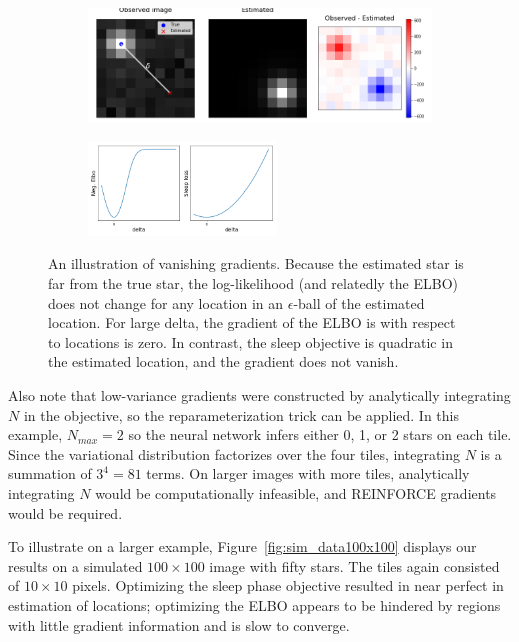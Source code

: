 \begin{figure}[!htb]
    \centering
    \begin{subfigure}[t]{0.8\textwidth}
    \centering
    \includegraphics[width=\textwidth]{figures/gradzero_cartoon.png}
    \end{subfigure}
    \begin{subfigure}[t]{\textwidth}
    \centering
    \includegraphics[width=0.55\textwidth]{figures/gradzero_cartoon2.png}
    \end{subfigure}
    \vspace{-3em}
    \caption{An illustration of vanishing gradients. Because the estimated star is far from the true star, the log-likelihood (and relatedly the ELBO) does not change for any location in an $\epsilon$-ball of the estimated location. 
    For large delta, the gradient of the ELBO is with respect to locations is zero. In contrast, the sleep objective is quadratic in the estimated location, and the gradient does not vanish. }
    \label{fig:gradzero_cartoon}
\end{figure}

Also note that low-variance gradients were constructed by analytically integrating $N$ in the objective, so the reparameterization trick can be applied. 
In this example, $N_{max} = 2$ so the neural network infers either 0, 1, or 2 stars on each tile. 
Since the variational distribution factorizes over the four tiles, integrating $N$ is a summation of $3^4 = 81$ terms.
On larger images with more tiles, analytically integrating $N$ would be computationally infeasible, and REINFORCE gradients would be required. 

To illustrate on a larger example, Figure~\ref{fig:sim_data100x100} displays our results on a simulated $100\times 100$ image with fifty stars. The tiles again consisted of $10\times 10$ pixels. Optimizing the sleep phase objective resulted in near perfect in estimation of locations; optimizing the ELBO appears to be hindered by regions with little gradient information and is slow to converge. 

